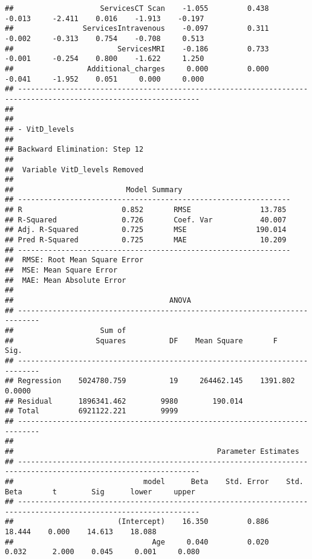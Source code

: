 \documentclass[
]{article}
\begin{document}
\begin{verbatim}
##                    ServicesCT Scan    -1.055         0.438       -0.013     -2.411    0.016    -1.913    -0.197 
##                ServicesIntravenous    -0.097         0.311       -0.002     -0.313    0.754    -0.708     0.513 
##                        ServicesMRI    -0.186         0.733       -0.001     -0.254    0.800    -1.622     1.250 
##                 Additional_charges     0.000         0.000       -0.041     -1.952    0.051     0.000     0.000 
## ----------------------------------------------------------------------------------------------------------------
## 
## 
## - VitD_levels 
## 
## Backward Elimination: Step 12 
## 
##  Variable VitD_levels Removed 
## 
##                          Model Summary                          
## ---------------------------------------------------------------
## R                       0.852       RMSE                13.785 
## R-Squared               0.726       Coef. Var           40.007 
## Adj. R-Squared          0.725       MSE                190.014 
## Pred R-Squared          0.725       MAE                 10.209 
## ---------------------------------------------------------------
##  RMSE: Root Mean Square Error 
##  MSE: Mean Square Error 
##  MAE: Mean Absolute Error 
## 
##                                    ANOVA                                    
## ---------------------------------------------------------------------------
##                    Sum of                                                  
##                   Squares          DF    Mean Square       F          Sig. 
## ---------------------------------------------------------------------------
## Regression    5024780.759          19     264462.145    1391.802    0.0000 
## Residual      1896341.462        9980        190.014                       
## Total         6921122.221        9999                                      
## ---------------------------------------------------------------------------
## 
##                                               Parameter Estimates                                                
## ----------------------------------------------------------------------------------------------------------------
##                              model      Beta    Std. Error    Std. Beta       t        Sig      lower     upper 
## ----------------------------------------------------------------------------------------------------------------
##                        (Intercept)    16.350         0.886                  18.444    0.000    14.613    18.088 
##                                Age     0.040         0.020        0.032      2.000    0.045     0.001     0.080 

\end{verbatim}
\end{document}
